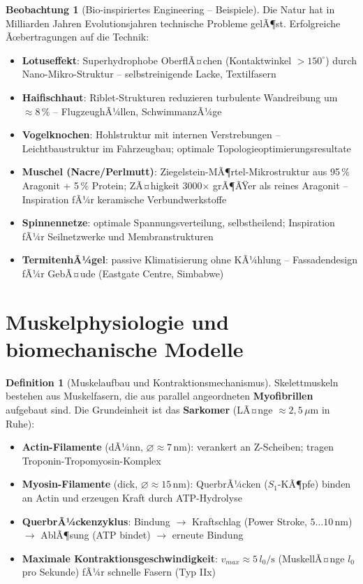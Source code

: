 ﻿\documentclass[a4paper,12pt]{report}
\theoremstyle{definition}
\newtheorem{definition}{Definition}
\newtheorem{beobachtung}{Beobachtung}
\begin{document}
\begin{beobachtung}[Bio-inspiriertes Engineering -- Beispiele]
Die Natur hat in Milliarden Jahren Evolutionsjahren technische Probleme gelÃ¶st.
Erfolgreiche Ãœbertragungen auf die Technik:
\begin{itemize}
    \item[-] \textbf{Lotuseffekt}: Superhydrophobe OberflÃ¤chen (Kontaktwinkel $> 150^\circ$)
          durch Nano-Mikro-Struktur -- selbstreinigende Lacke, Textilfasern
    \item[-] \textbf{Haifischhaut}: Riblet-Strukturen reduzieren turbulente
          Wandreibung um $\approx 8\,\%$ -- FlugzeughÃ¼llen, SchwimmanzÃ¼ge
    \item[-] \textbf{Vogelknochen}: Hohlstruktur mit internen Verstrebungen --
          Leichtbaustruktur im Fahrzeugbau; optimale Topologieoptimierungsresultate
    \item[-] \textbf{Muschel (Nacre/Perlmutt)}: Ziegelstein-MÃ¶rtel-Mikrostruktur
          aus 95\,\% Aragonit + 5\,\% Protein; ZÃ¤higkeit 3000$\times$ grÃ¶ÃŸer als
          reines Aragonit -- Inspiration fÃ¼r keramische Verbundwerkstoffe
    \item[-] \textbf{Spinnennetze}: optimale Spannungsverteilung, selbstheilend;
          Inspiration fÃ¼r Seilnetzwerke und Membranstrukturen
    \item[-] \textbf{TermitenhÃ¼gel}: passive Klimatisierung ohne KÃ¼hlung --
          Fassadendesign fÃ¼r GebÃ¤ude (Eastgate Centre, Simbabwe)
\end{itemize}
\end{beobachtung}


\section{Muskelphysiologie und biomechanische Modelle}

\begin{definition}[Muskelaufbau und Kontraktionsmechanismus]
Skelettmuskeln bestehen aus Muskelfasern, die aus parallel angeordneten
\textbf{Myofibrillen} aufgebaut sind. Die Grundeinheit ist das \textbf{Sarkomer}
(LÃ¤nge $\approx 2{,}5\,\mu\mathrm{m}$ in Ruhe):
\begin{itemize}
    \item[-] \textbf{Actin-Filamente} (dÃ¼nn, $\varnothing \approx 7\,\mathrm{nm}$):
          verankert an Z-Scheiben; tragen Troponin-Tropomyosin-Komplex
    \item[-] \textbf{Myosin-Filamente} (dick, $\varnothing \approx 15\,\mathrm{nm}$):
          QuerbrÃ¼cken ($S_1$-KÃ¶pfe) binden an Actin und erzeugen Kraft durch ATP-Hydrolyse
    \item[-] \textbf{QuerbrÃ¼ckenzyklus}: Bindung $\to$ Kraftschlag (Power Stroke, $5\ldots10\,\mathrm{nm}$)
          $\to$ AblÃ¶sung (ATP bindet) $\to$ erneute Bindung
    \item[-] \textbf{Maximale Kontraktionsgeschwindigkeit}: $v_{max} \approx 5\,l_0/\mathrm{s}$
          (MuskellÃ¤nge $l_0$ pro Sekunde) fÃ¼r schnelle Fasern (Typ IIx)
\end{itemize}
\end{definition}
\end{document}
